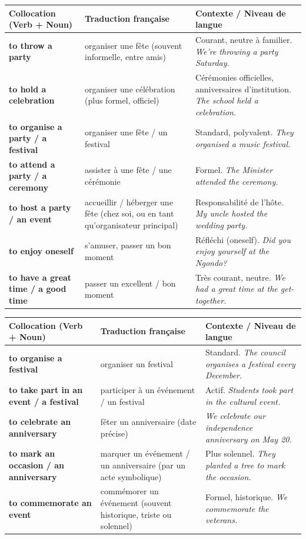 \documentclass[11pt]{article}
\newcommand{\eng}[1]{\ifmmode\text{\textit{#1}}\else\begingroup\selectlanguage{english}\itshape #1\endgroup\fi}
\begin{document}
\begin{center}
\begin{tabularx}{\linewidth}{|X|X|X|}
\hline
\rowcolor{popblueL} \textbf{Collocation (Verb + Noun)} & \textbf{Traduction française} & \textbf{Contexte / Niveau de langue} \\
\hline
\textbf{to throw a party} & organiser une fête (souvent informelle, entre amis) & Courant, neutre à familier. \eng{We’re throwing a party Saturday.} \\
\textbf{to hold a celebration} & organiser une célébration (plus formel, officiel) & Cérémonies officielles, anniversaires d’institution. \eng{The school held a celebration.} \\
\textbf{to organise a party / a festival} & organiser une fête / un festival & Standard, polyvalent. \eng{They organised a music festival.} \\
\textbf{to attend a party / a ceremony} & assister à une fête / une cérémonie & Formel. \eng{The Minister attended the ceremony.} \\
\textbf{to host a party / an event} & accueillir / héberger une fête (chez soi, ou en tant qu’organisateur principal) & Responsabilité de l’hôte. \eng{My uncle hosted the wedding party.} \\
\textbf{to enjoy oneself} & s’amuser, passer un bon moment & Réfléchi (oneself). \eng{Did you enjoy yourself at the Ngondo?} \\
\textbf{to have a great time / a good time} & passer un excellent / bon moment & Très courant, neutre. \eng{We had a great time at the get-together.} \\
\hline
\end{tabularx}
\end{center}

\begin{center}
\begin{tabularx}{\linewidth}{|X|X|X|}
\hline
\rowcolor{popgreenL} \textbf{Collocation (Verb + Noun)} & \textbf{Traduction française} & \textbf{Contexte / Niveau de langue} \\
\hline
\textbf{to organise a festival} & organiser un festival & Standard. \eng{The council organises a festival every December.} \\
\textbf{to take part in an event / a festival} & participer à un événement / un festival & Actif. \eng{Students took part in the cultural event.} \\
\textbf{to celebrate an anniversary} & fêter un anniversaire (date précise) & \eng{We celebrate our independence anniversary on May 20.} \\
\textbf{to mark an occasion / an anniversary} & marquer un événement / un anniversaire (par un acte symbolique) & Plus solennel. \eng{They planted a tree to mark the occasion.} \\
\textbf{to commemorate an event} & commémorer un événement (souvent historique, triste ou solennel) & Formel, historique. \eng{We commemorate the veterans.} \\
\hline
\end{tabularx}
\end{center}
\end{document}
